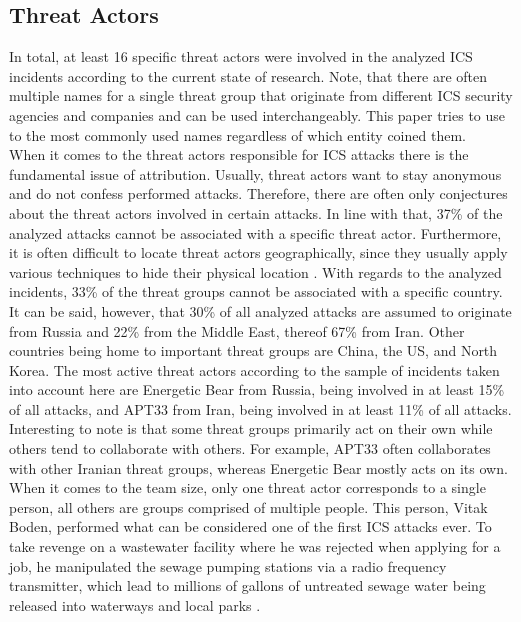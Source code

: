 \documentclass[runningheads]{llncs}
\begin{document}
\subsection{Threat Actors}
\label{subsection:overview-actors}
In total, at least 16 specific threat actors were involved in the analyzed ICS incidents according to the current state of research.
Note, that there are often multiple names for a single threat group that originate from different ICS security agencies and companies \cite{thaicert.19} and can be used interchangeably.
This paper tries to use to the most commonly used names regardless of which entity coined them.\\
When it comes to the threat actors responsible for ICS attacks there is the fundamental issue of attribution.
Usually, threat actors want to stay anonymous and do not confess performed attacks. %
Therefore, there are often only conjectures about the threat actors involved in certain attacks.
In line with that, 37\% of the analyzed attacks cannot be associated with a specific threat actor.
Furthermore, it is often difficult to locate threat actors geographically, since they usually apply various techniques to hide their physical location \cite{huang.18}.
With regards to the analyzed incidents, 33\% of the threat groups cannot be associated with a specific country.
It can be said, however, that 30\% of all analyzed attacks are assumed to originate from Russia and 22\% from the Middle East, thereof 67\% from Iran.
Other countries being home to important threat groups are China, the US, and North Korea.
The most active threat actors according to the sample of incidents taken into account here are Energetic Bear from Russia, being involved in at least 15\% of all attacks, and APT33 from Iran, being involved in at least 11\% of all attacks.
Interesting to note is that some threat groups primarily act on their own while others tend to collaborate with others.
For example, APT33 often collaborates with other Iranian threat groups, whereas Energetic Bear mostly acts on its own.
When it comes to the team size, only one threat actor corresponds to a single person, all others are groups comprised of multiple people.
This person, Vitak Boden, performed what can be considered one of the first ICS attacks ever.
To take revenge on a wastewater facility where he was rejected when applying for a job, he manipulated the sewage pumping stations via a radio frequency transmitter, which lead to millions of gallons of untreated sewage water being released into waterways and local parks \cite{hemsley.18}.
\end{document}
